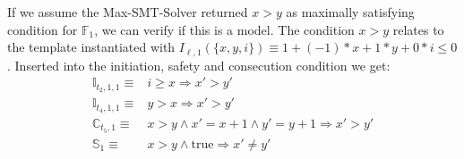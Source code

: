 If we assume the Max-SMT-Solver returned $x > y$ as maximally satisfying condition for $\mathbb{F}_1$, we can verify if this is a model.
The condition $x > y$ relates to the template instantiated with $I_{\ell,1}(\lbrace x, y, i \rbrace) \equiv 1 + (-1) * x + 1 * y + 0 * i \leq 0$.
Inserted into the initiation, safety and consecution condition we get:
\begin{align}
  \mathbb{I}_{t_2, 1, 1} \equiv & i \geq x \Rightarrow x' > y'\\
  \mathbb{I}_{t_4, 1, 1} \equiv & y > x \Rightarrow x' > y'\\
  \mathbb{C}_{t_5, 1} \equiv & x > y \wedge x' = x + 1 \wedge y' = y + 1 \Rightarrow x' > y'\\
  \mathbb{S}_1 \equiv & x > y \wedge \text{true} \Rightarrow x' \neq y'
\end{align}


